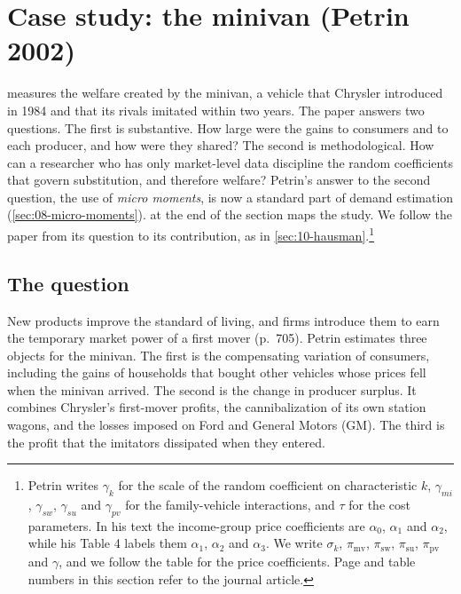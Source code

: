 \section{Case study: the minivan (Petrin 2002)}\label{sec:10-petrin}

\citet{Petrin2002} measures the welfare created by the minivan, a vehicle that Chrysler introduced in 1984 and that
its rivals imitated within two years. The paper answers two questions. The first is substantive. How large were the
gains to consumers and to each producer, and how were they shared? The second is methodological. How can a
researcher who has only market-level data discipline the random coefficients that govern substitution, and therefore
welfare? Petrin's answer to the second question, the use of \emph{micro moments}, is now a standard part of demand
estimation (\cref{sec:08-micro-moments}).  at the end of the section maps the study.
We follow the paper from its question to its contribution, as in
\cref{sec:10-hausman}.\footnote{Petrin writes $\gamma_k$ for the scale of the random coefficient on characteristic $k$,
$\gamma_{mi}$, $\gamma_{sw}$, $\gamma_{su}$ and $\gamma_{pv}$ for the family-vehicle interactions, and $\tau$ for the
cost parameters. In his text the income-group price coefficients are $\alpha_0$, $\alpha_1$ and $\alpha_2$, while his
Table 4 labels them $\alpha_1$, $\alpha_2$ and $\alpha_3$. We write $\sigma_k$, $\pi_{\mathrm{mv}}$, $\pi_{\mathrm{sw}}$,
$\pi_{\mathrm{su}}$, $\pi_{\mathrm{pv}}$ and $\gamma$, and we follow the table for the price coefficients. Page and
table numbers in this section refer to the journal article.}

\subsection{The question}\label{sec:10-petrin-question}

New products improve the standard of living, and firms introduce them to earn the temporary market power of a first
mover (p.~705). Petrin estimates three objects for the minivan. The first is the compensating variation of consumers,
including the gains of households that bought other vehicles whose prices fell when the minivan arrived. The second
is the change in producer surplus. It combines Chrysler's first-mover profits, the cannibalization of its own station
wagons, and the losses imposed on Ford and General Motors (GM). The third is the profit that the imitators dissipated
when they entered.

